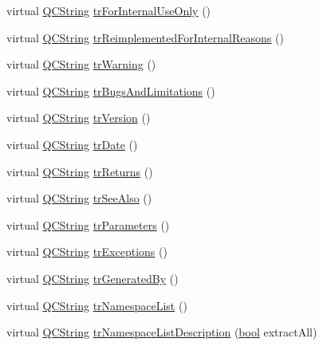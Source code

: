 \begin{DoxyCompactItemize}
\item 
virtual \hyperlink{class_q_c_string}{Q\+C\+String} \hyperlink{class_translator_arabic_a18f11fe65de52452965f8b16974c144d}{tr\+For\+Internal\+Use\+Only} ()
\item 
virtual \hyperlink{class_q_c_string}{Q\+C\+String} \hyperlink{class_translator_arabic_a059a6f4e8d6d6be88c0091250b5eba77}{tr\+Reimplemented\+For\+Internal\+Reasons} ()
\item 
virtual \hyperlink{class_q_c_string}{Q\+C\+String} \hyperlink{class_translator_arabic_aff497d8b773ee4c2e8e2c395c6b130b0}{tr\+Warning} ()
\item 
virtual \hyperlink{class_q_c_string}{Q\+C\+String} \hyperlink{class_translator_arabic_aca059592bf0ce2039a8d02a80d425f63}{tr\+Bugs\+And\+Limitations} ()
\item 
virtual \hyperlink{class_q_c_string}{Q\+C\+String} \hyperlink{class_translator_arabic_ab3f45911a62c7c316ed65c8d7454c102}{tr\+Version} ()
\item 
virtual \hyperlink{class_q_c_string}{Q\+C\+String} \hyperlink{class_translator_arabic_a6de935804cfbbf90e35d06b8a94e78c4}{tr\+Date} ()
\item 
virtual \hyperlink{class_q_c_string}{Q\+C\+String} \hyperlink{class_translator_arabic_ab88dc42d6bc73e21be0b5cf4c1cc5ae7}{tr\+Returns} ()
\item 
virtual \hyperlink{class_q_c_string}{Q\+C\+String} \hyperlink{class_translator_arabic_a89ec878fbf206c84597d32e2cf3ecff2}{tr\+See\+Also} ()
\item 
virtual \hyperlink{class_q_c_string}{Q\+C\+String} \hyperlink{class_translator_arabic_a3c12052d296a5979c62e84f4fa372169}{tr\+Parameters} ()
\item 
virtual \hyperlink{class_q_c_string}{Q\+C\+String} \hyperlink{class_translator_arabic_a6eabaaa6157a6ebd1ddccca45d2b42c2}{tr\+Exceptions} ()
\item 
virtual \hyperlink{class_q_c_string}{Q\+C\+String} \hyperlink{class_translator_arabic_ac92207fe531289a746c7271f14c13a0d}{tr\+Generated\+By} ()
\item 
virtual \hyperlink{class_q_c_string}{Q\+C\+String} \hyperlink{class_translator_arabic_a33167321877207351c8585d4473c8a5c}{tr\+Namespace\+List} ()
\item 
virtual \hyperlink{class_q_c_string}{Q\+C\+String} \hyperlink{class_translator_arabic_aea04132430764777158628a5df751e47}{tr\+Namespace\+List\+Description} (\hyperlink{qglobal_8h_a1062901a7428fdd9c7f180f5e01ea056}{bool} extract\+All)
\item 

\end{DoxyCompactItemize}
